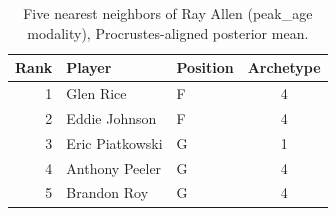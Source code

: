 \begin{table}[htbp]
  \centering\small
  \begin{tabular}{rllc}
    \toprule
    Rank & Player & Position & Archetype \\
    \midrule
    1 & Glen Rice & F & 4 \\
    2 & Eddie Johnson & F & 4 \\
    3 & Eric Piatkowski & G & 1 \\
    4 & Anthony Peeler & G & 4 \\
    5 & Brandon Roy & G & 4 \\
    \bottomrule
  \end{tabular}
  \caption{Five nearest neighbors of Ray Allen (peak_age modality), Procrustes-aligned posterior mean.}
  \label{tab:Ray_Allen_neighbors_peak_age}
\end{table}

